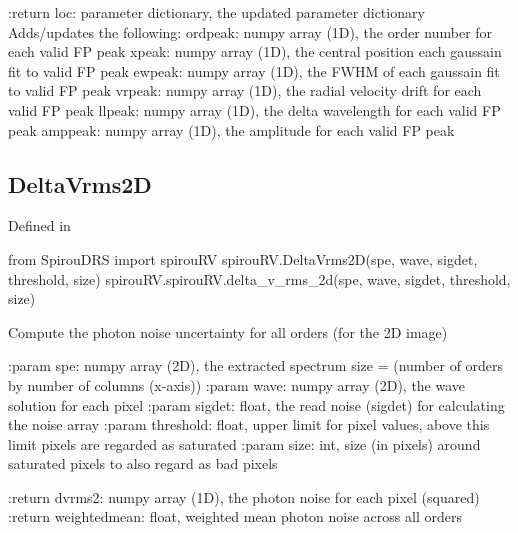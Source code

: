 \begin{minipage}{\textwidth}
\begin{pythondocstring}
:return loc: parameter dictionary, the updated parameter dictionary
        Adds/updates the following:
            ordpeak: numpy array (1D), the order number for each valid FP
                     peak
            xpeak: numpy array (1D), the central position each gaussain fit
                   to valid FP peak
            ewpeak: numpy array (1D), the FWHM of each gaussain fit
                    to valid FP peak
            vrpeak: numpy array (1D), the radial velocity drift for each
                    valid FP peak
            llpeak: numpy array (1D), the delta wavelength for each valid
                    FP peak
            amppeak: numpy array (1D), the amplitude for each valid FP peak
\end{pythondocstring}
\end{minipage}

\begin{minipage}{\textwidth}
\subsection{DeltaVrms2D}

Defined in \spirouRV{}

\begin{pythonbox}
from SpirouDRS import spirouRV
spirouRV.DeltaVrms2D(spe, wave, sigdet, threshold, size)
spirouRV.spirouRV.delta_v_rms_2d(spe, wave, sigdet, threshold, size)
\end{pythonbox}

\begin{pythondocstring}
Compute the photon noise uncertainty for all orders (for the 2D image)

:param spe: numpy array (2D), the extracted spectrum
            size = (number of orders by number of columns (x-axis))
:param wave: numpy array (2D), the wave solution for each pixel
:param sigdet: float, the read noise (sigdet) for calculating the
               noise array
:param threshold: float, upper limit for pixel values, above this limit
                  pixels are regarded as saturated
:param size: int, size (in pixels) around saturated pixels to also regard
             as bad pixels

:return dvrms2: numpy array (1D), the photon noise for each pixel (squared)
:return weightedmean: float, weighted mean photon noise across all orders
\end{pythondocstring}
\end{minipage}

